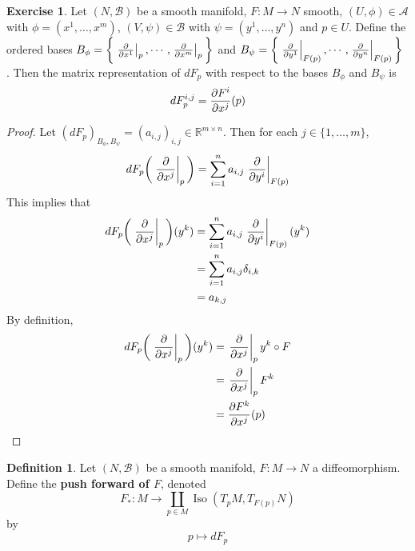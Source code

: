 \documentclass[12pt]{amsart}
\theoremstyle{definition}
\newtheorem{defn}[definition]{Definition}
\newtheorem{ex}[definition]{Exercise}
\newcommand{\del}{\delta}
\newcommand{\R}{\mathbb{R}}
\newcommand{\MA}{\mathcal{A}}
\newcommand{\MB}{\mathcal{B}}
\DeclareMathOperator{\iso}{Iso}
\begin{document}
	\begin{ex}
		Let $(N, \MB)$ be a smooth manifold, $F: M \rightarrow N$ smooth, $(U, \phi) \in \MA$ with $\phi = (x^1, \dots, x^m)$, $(V, \psi) \in \MB$ with $\psi = (y^1, \dots, y^n)$  and $p \in U$. Define the ordered bases $B_\phi = \bigg \{\eval{\pdv{x^1}}_{p}, \cdots, \eval{\pdv{x^m}}_{p} \bigg \}$ and $B_{\psi} = \bigg \{\eval{\pdv{y^1}}_{F(p)}, \cdots, \eval{\pdv{y^n}}_{F(p)} \bigg \}$ .
		Then the matrix representation of $dF_p$ with respect to the bases
		$B_{\phi}$ and $B_{\psi}$ is $$ dF_p^{i,j} =  {\pdv{F^i}{x^j}}(p)$$
	\end{ex}

	\begin{proof}
		Let $(dF_p)_{B_\phi, B_{\psi}} = (a_{i,j})_{i,j} \in \R^{m \times n}$. Then for each $j \in \{1, \dots, m\}$, $$dF_p \bigg(\eval{\pdv{x^j}}_p\bigg) = \sum_{i=1}^n a_{i,j}\eval{ \pdv{y^i}}_{F(p)}$$
		This implies that 
		\begin{align*}
			dF_p \bigg(\eval{\pdv{x^j}}_p\bigg) (y^k )
			&=   \sum_{i=1}^n a_{i,j}\eval{ \pdv{y^i}}_{F(p)} (y^k) \\
			&= \sum_{i=1}^n a_{i,j} \del_{i,k} \\
			&= a_{k, j}
		\end{align*}
		By definition, 
		\begin{align*}
			dF_p \bigg(\eval{\pdv{x^j}}_p\bigg) (y^k )
			&=  \eval{\pdv{x^j}}_p y^k \circ F \\
			&= \eval{\pdv{x^j}}_p F^k \\
			&= {\pdv{F^k}{x^j}}(p)
		\end{align*}
	\end{proof}
	
	
	

	\newpage

	\begin{defn}
		Let $(N, \MB)$ be a smooth manifold, $F: M \rightarrow N$ a diffeomorphism. Define the \textbf{push forward of $F$}, denoted $$F_*:M \rightarrow \coprod_{p \in M} \iso(T_pM, T_{F(p)}N)$$ by $$p \mapsto dF_p$$
	\end{defn}
	
	



	
	
	
	
	
	
	
	
	
	
	
	
	
	
	\newpage
\end{document}
